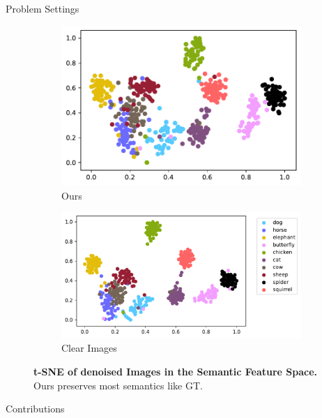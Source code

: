 \documentclass[final]{beamer}
\newlength{\colwidth}
\begin{document}
\begin{frame}[t]
\begin{columns}[t]
\begin{column}{\colwidth}
\begin{block}{Problem Settings}
\begin{figure}
\begin{subfigure}[c]{.22\linewidth}
    \includegraphics[width=1\linewidth]{contents/feature-space/dst.pdf}
    \caption{Ours}
  \end{subfigure}
  \hfill
  \begin{subfigure}[c]{.285\linewidth}
    \captionsetup{justification=centering, labelformat=empty, font=small}
    \includegraphics[width=1\linewidth]{contents/feature-space/gt.pdf}
    \caption{Clear Images}
  \end{subfigure}  
  \vspace{-.2in}
  \caption{\textbf{t-SNE of denoised Images in the Semantic Feature Space.} Ours preserves most semantics like GT.}
\end{figure}


  \end{block}

  \begin{alertblock}{Contributions}

  \end{alertblock}

\end{column}


\end{columns}
\end{frame}
\end{document}
